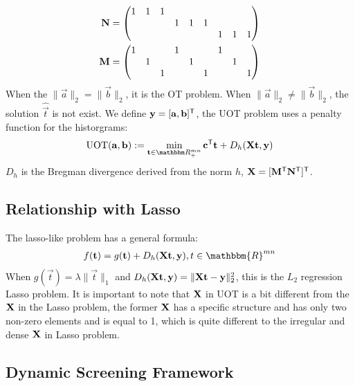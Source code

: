 \begin{equation}
\begin{split}
\mathbf{N}&=\begin{pmatrix}
1&1&1& & & & & &\\
 & & &1&1&1& & &\\
 & & & & & &1&1&1\\
\end{pmatrix}\\
\mathbf{M}&=\begin{pmatrix}
 1& & &1& & &1& &\\
 &1& & &1& & &1&\\
 & &1& & &1& & &1\\
 \end{pmatrix}
  \end{split}
 \end{equation}
When the $\|\vec{a}\|_2 = \|\vec{b}\|_2$, it is the OT problem. When $\|\vec{a}\|_2 \neq \|\vec{b}\|_2$, the solution $\hat{\vec{t}}$ is not exist. We define $\mathbf{y} = [\mathbf{a}, \mathbf{b}]^{\mathsf T}$, the UOT problem uses a penalty function for the historgrams: 
\begin{equation}
\label{eq:uot}
\operatorname{UOT}(\vec{a},\vec{b}) := \min_{\vec{t} \in \R_{+}^{mn}} \vec{c}^{\tranT}\vec{t} + D_h(\mat{X}\vec{t},\vec{y})
\end{equation}
$D_h$ is the Bregman divergence derived from the norm $h$, $\mathbf{X} = [\mathbf{M}^{\mathsf T} \mathbf{N}^{\mathsf T}]^{\mathsf T}$. 

\subsection{Relationship with Lasso}
The lasso-like problem has a general formula:
$$
\begin{aligned}
f(\vec{t}) = g(\vec{t}) + D_h(\mat{X} \vec{t},\vec{y}), t\in \mathbbm{R}^{mn}
\end{aligned}
$$
When $g(\vec{t}) = \lambda \|\vec{t}\|_1$ and $D_h(\mathbf{X} \mathbf{t},\mathbf{y}) = \|\mathbf{X} \mathbf{t}-\mathbf{y}\|_2^2$, this is the $L_2$ regression Lasso problem. It is important to note that $\mathbf{X}$ in UOT is a bit different from the $\mathbf{X}$ in the Lasso problem, the former $\mathbf{X}$ has a specific structure and has only two non-zero elements and is equal to 1, which is quite different to the irregular and dense $\mathbf{X}$ in Lasso problem.


\subsection{Dynamic Screening Framework}

